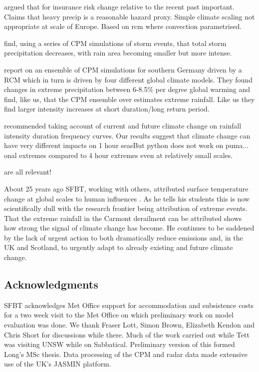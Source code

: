 \documentclass[11pt,a4paper]{article}
\begin{document}
\cite{lang2024catmodels} argued that for insurance risk change relative to the recent past important. Claims that heavy precip is a reasonable hazard proxy. Simple climate scaling not appropriate at scale of Europe. Based on  rcm where convection parametrised.

\cite{Moshe2022extremes} find, using a series of CPM simulations  of storm events, that total storm precipitation decreases, with rain area becoming smaller but more intense. 

\cite{hundhausen2024extreme_precip} report on an ensemble of CPM simulations for southern Germany driven by a RCM which in turn is driven by four different global climate models. They found changes in extreme precipitation between 6-8.5\% per degree global warming and find, like us, that the CPM ensemble over estimates extreme rainfall. Like us they find larger intensity increases at short duration/long return period.  

\cite{martel2021rainfall_ifd} recommended taking account of current and future climate change on rainfall intensity duration frequency curves. Our results suggest that climate change can have very different impacts on 1 hour seasBut python does not work on puma... onal extremes compared to 4 hour extremes even at relatively small scales. 

\cite{saltikoff2019radar_climate,kendon2021ukclimate,karoly06cet,harrison2000nimrod,kendon2023uk_climate} are all relevant! 

About 25 years ago SFBT, working with others, attributed surface temperature  change at global scales to human influences \parencite{tett99c20tc,stott00sci}. As he tells his students this is now scientifically dull with the research frontier being attribution of extreme  events. That the extreme rainfall in the Carmont derailment can be attributed shows how strong the signal of climate change has become.  He continues to be saddened by the lack of urgent action to both dramatically reduce emissions and, in the UK and Scotland, to urgently adapt to already existing and future climate change\parencite{ccc2024no_action}.

\printbibliography %

\subsection*{Acknowledgments}
SFBT acknowledges  Met Office support for accommodation and subsistence costs for a two week visit to the Met Office on which preliminary work on model evaluation was done. We thank Fraser Lott, Simon Brown, Elizabeth Kendon and Chris Short for discussions while there. Much of the  work carried out while Tett was visiting UNSW while on Sabbatical. Preliminary version of this formed Long's MSc thesis. Data processing of the CPM and radar data made extensive use of the UK's JASMIN platform. 
\end{document}

